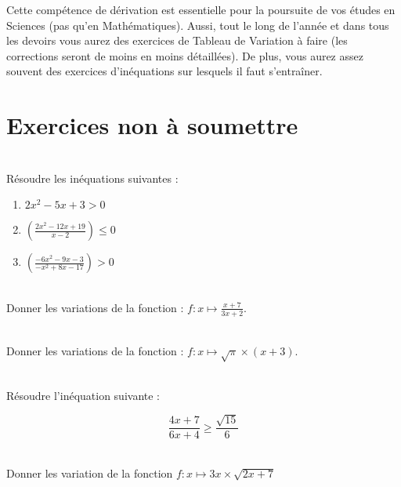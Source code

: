 \documentclass[12pt,fleqn]{report} %
\begin{document}
\begin{remark}
	Cette compétence de dérivation est essentielle pour la poursuite de vos études en Sciences (pas qu'en Mathématiques). Aussi, tout le long de l'année et dans tous les devoirs vous aurez des exercices de Tableau de Variation à faire (les corrections seront de moins en moins détaillées). De plus, vous aurez assez souvent des exercices d'inéquations sur lesquels il faut s'entraîner. 
\end{remark}

\chapter*{Exercices non à soumettre}
\begin{exercise}\label{Exercice 8}\text{ }\\
	Résoudre les inéquations suivantes : 
	
	\begin{enumerate}
		\item $2x^2-5x+3>0$
		\item $\left(\frac{2x^2-12x+19}{x-2}\right)\leq0$
		\item $\left(\frac{-6x^2-9x-3}{-x^2+8x-17}\right)>0$
	\end{enumerate}
\end{exercise}

\begin{exercise}\label{Exercice 20}\text{ }\\
	Donner les variations de la fonction : $f : x \mapsto \frac{x+7}{3x+2}$.
\end{exercise}

\begin{exercise}\label{Exercice 21}\text{ }\\
	Donner les variations de la fonction : $f : x \mapsto \sqrt{\pi}\times(x+3)$.
\end{exercise}

\begin{exercise}\label{Exercice 31}\text{ }\\
	Résoudre l'inéquation suivante :
	
	\begin{equation*}
	\frac{4x+7}{6x+4}\geq \frac{\sqrt{15}}{6}   
	\end{equation*}
\end{exercise}


\begin{exercise}\label{Exercice 32}\text{ }\\
	Donner les variation de la fonction $f : x \mapsto 3x \times \sqrt{2x+7}$
\end{exercise}
\end{document}
